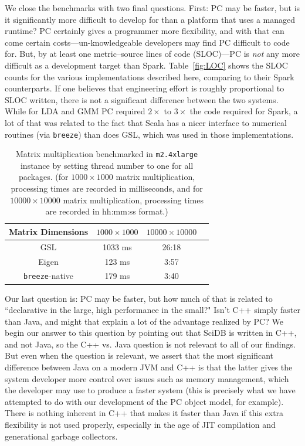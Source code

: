 We close the benchmarks with two final questions.  First: PC may be faster, but is it significantly more difficult to develop
for than a platform that uses a managed runtime?  PC certainly gives a programmer more flexibility, and with that can come
certain costs---un-knowledgeable developers may find PC difficult to code for.  But, by at least one metric--source
lines of code (SLOC)---PC is \emph{not}
any more difficult as a development target than Spark.
Table~\ref{fig:LOC} shows the SLOC counts for the various implementations described here, comparing to their Spark counterparts.
If one believes that engineering effort is roughly proportional to SLOC written, there is not a significant
difference between the two
systems.  
While for LDA and GMM PC required $2\times$ to $3\times$ the code required for Spark, a lot of that was related
to the fact that Scala has a nicer interface to numerical routines (via \texttt{breeze}) 
than does GSL, which was used in those
implementations.

\begin{table}[H]
\small
\begin{center}
\begin{tabular}{|c||c|c|c|}
\hline
Matrix Dimensions & $1000\times1000$ & $10000\times10000$ \\
\hline
\hline
GSL &1033 ms &26:18  \\
Eigen &123 ms  &3:57\\
\texttt{breeze}-native &179 ms  &3:40\\
\hline
\end{tabular}
\caption{Matrix multiplication benchmarked in
  \texttt{m2.4xlarge} instance by setting thread number  to one for all
  packages. (for
  $1000\times1000$ matrix multiplication, processing times are recorded in
  milliseconds, and for $10000\times10000$ matrix multiplication, processing times are
  recorded in hh:mm:ss format.)}
\label{fig:matrixMult}
\end{center}
\vspace{-20pt}
\end{table}

Our last question is: PC may be faster, but how much of that is related to ``declarative in the large, high performance in 
the small?"   Isn't C++ simply faster than Java, and might that explain a lot of the advantage realized by PC?  We begin
our answer to this question by pointing out that SciDB is written in C++, and not Java, so the C++ vs. Java question is not 
relevant to all of our findings.
But even when the question is relevant, we assert that the most significant
difference between Java on a modern JVM and C++ is that the latter
gives the system developer more control over issues such as memory management, 
which the developer may use to produce a faster system (this is precisely
what we have attempted to do with our development of the PC object model, for example).  
There is nothing inherent in C++ that makes it faster than Java if this extra flexibility is not used properly, 
especially in the age of
JIT compilation and generational garbage collectors.  

